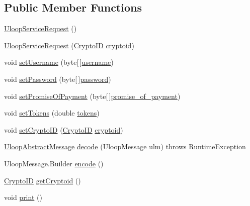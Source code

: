 \subsection*{Public Member Functions}
\begin{DoxyCompactItemize}
\item 
\hyperlink{classlib_1_1api_1_1UloopServiceRequest_a7efc91eb413b65384b379dddbbdc8166}{Uloop\+Service\+Request} ()
\item 
\hyperlink{classlib_1_1api_1_1UloopServiceRequest_ac7928f753be32f759214773e9eb9d2cf}{Uloop\+Service\+Request} (\hyperlink{classlib_1_1api_1_1CryptoID}{Crypto\+I\+D} \hyperlink{classlib_1_1api_1_1UloopServiceRequest_affac2350c8b10ac404fa381f4ee93cb0}{cryptoid})
\item 
void \hyperlink{classlib_1_1api_1_1UloopServiceRequest_a951ef79492864bb953168d14666e7dfc}{set\+Username} (byte\mbox{[}$\,$\mbox{]}\hyperlink{classlib_1_1api_1_1UloopServiceRequest_a8a929330893f001347b4df81927edd4c}{username})
\item 
void \hyperlink{classlib_1_1api_1_1UloopServiceRequest_a591c6f2cfe2218c889ea7c81174d1d55}{set\+Password} (byte\mbox{[}$\,$\mbox{]}\hyperlink{classlib_1_1api_1_1UloopServiceRequest_a0c23579473c23dbc9411c2c444af4714}{password})
\item 
void \hyperlink{classlib_1_1api_1_1UloopServiceRequest_adf89fa97301f24dae9d16580f2170903}{set\+Promise\+Of\+Payment} (byte\mbox{[}$\,$\mbox{]}\hyperlink{classlib_1_1api_1_1UloopServiceRequest_a1a1cd5bf12daafcaea1a016b717cc719}{promise\+\_\+of\+\_\+payment})
\item 
void \hyperlink{classlib_1_1api_1_1UloopServiceRequest_a9b40ab10532f92bb429758296a474def}{set\+Tokens} (double \hyperlink{classlib_1_1api_1_1UloopServiceRequest_a768929461a7fbf8cfabb565a00c44d64}{tokens})
\item 
void \hyperlink{classlib_1_1api_1_1UloopServiceRequest_affcac88524bf65f1ef0301b0b20f340a}{set\+Crypto\+I\+D} (\hyperlink{classlib_1_1api_1_1CryptoID}{Crypto\+I\+D} \hyperlink{classlib_1_1api_1_1UloopServiceRequest_affac2350c8b10ac404fa381f4ee93cb0}{cryptoid})
\item 
\hyperlink{interfacelib_1_1api_1_1UloopAbstractMessage}{Uloop\+Abstract\+Message} \hyperlink{classlib_1_1api_1_1UloopServiceRequest_a4a8a64d824425f1d326f3be82115ccf2}{decode} (Uloop\+Message ulm)  throws Runtime\+Exception
\item 
Uloop\+Message.\+Builder \hyperlink{classlib_1_1api_1_1UloopServiceRequest_a13409dd756188327c2885eda6f9a8b17}{encode} ()
\item 
\hyperlink{classlib_1_1api_1_1CryptoID}{Crypto\+I\+D} \hyperlink{classlib_1_1api_1_1UloopServiceRequest_a3bad2fd6dc96c07cf6ac6b076b597a64}{get\+Cryptoid} ()
\item 
void \hyperlink{classlib_1_1api_1_1UloopServiceRequest_a297690e00aed1f79499de2c9095fe52c}{print} ()
\end{DoxyCompactItemize}
